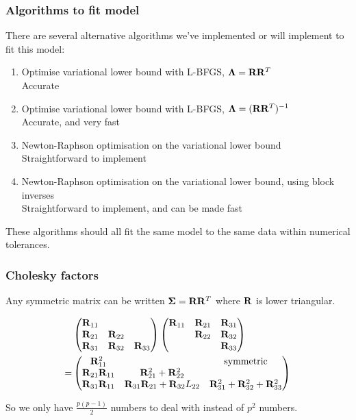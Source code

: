 \documentclass{beamer}
\begin{document}
\begin{frame}
\frametitle{Algorithms to fit model}
There are several alternative algorithms we've implemented or will implement
to fit this model:
\begin{enumerate}
\item Optimise variational lower bound with L-BFGS, ${\boldsymbol \Lambda} = {\bf R} {\bf R}^T$\\
\quad Accurate
\item Optimise variational lower bound with L-BFGS, ${\boldsymbol \Lambda} = ({\bf R} {\bf R}^T)^{-1}$ \\
\quad Accurate, and very fast
\item Newton-Raphson optimisation on the variational lower bound \\
\quad Straightforward to implement
\item Newton-Raphson optimisation on the variational lower bound, using block inverses \\
\quad Straightforward to implement, and can be made fast
\end{enumerate}

These algorithms should all fit the same model to the same data
within numerical tolerances.
\end{frame}

\begin{frame}
\frametitle{Cholesky factors}
Any symmetric matrix can be written ${\boldsymbol \Sigma} = {\bf R} {\bf R}^T$
where ${\bf R}$ is lower triangular.

\begin{align*}
&\begin{pmatrix}
{\bf R}_{11} \\
{\bf R}_{21} & {\bf R}_{22} \\
{\bf R}_{31} & {\bf R}_{32} & {\bf R}_{33}
\end{pmatrix}
\begin{pmatrix}
{\bf R}_{11} & {\bf R}_{21} & {\bf R}_{31} \\
& {\bf R}_{22} & {\bf R}_{32} \\
& & {\bf R}_{33}
\end{pmatrix}
\\
=& \begin{pmatrix}
{\bf R}_{11}^2 & & \text{symmetric}\\
{\bf R}_{21}{\bf R}_{11} & {\bf R}_{21}^2 + {\bf R}_{22}^2 \\
{\bf R}_{31} {\bf R}_{11} & {\bf R}_{31}{\bf R}_{21} + {\bf R}_{32}L_{22} & {\bf R}_{31}^2 + {\bf R}_{32} ^2 + {\bf R}_{33}^2
\end{pmatrix}
\end{align*}

So we only have $\frac{p(p-1)}{2}$ numbers to deal with instead of
$p^2$ numbers.

\end{frame}
\end{document}
